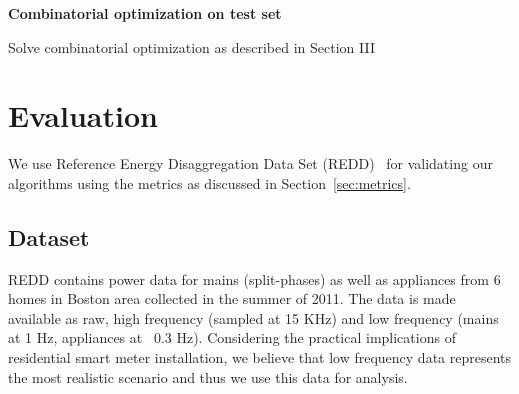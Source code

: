 \documentclass[conference]{IEEEtran}
\newcommand{\figref}[1]{Figure~\ref{#1}}
\newcommand{\secref}[1]{Section~\ref{#1}}
\newcommand{\indicns}{INDiC}
\begin{document}
\begin{algorithm}[ht!]
{}


\BlankLine
\textbf{Combinatorial optimization on test set} \;
\BlankLine  
    
\nl Solve combinatorial optimization as described in Section III

\nl {}\;
\caption{\indicns-CO}
\label{algo:main}

\end{algorithm}


\vspace{-2mm}
\section{Evaluation}
\vspace{-2mm}

\noindent We use Reference Energy Disaggregation Data Set (REDD)~\cite{redd} for validating our algorithms using the metrics as discussed in \secref{sec:metrics}. %

\vspace{-5mm}
\subsection{Dataset}
\vspace{-2mm}
\noindent REDD contains power data for mains (split-phases) as well as appliances from 6 homes in Boston area collected in the summer of 2011. The data is made available as raw, high frequency (sampled at 15 KHz) and low frequency (mains at 1 Hz, appliances at ~0.3 Hz). Considering the practical implications of residential smart meter installation, we believe that low frequency data represents the most realistic scenario and thus we use this data for analysis. 

\end{document}
